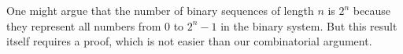 

\setcounter{section}{2}
\setcounter{subsection}{2}
\setcounter{dfn}{7}

\begin{rem}
One might argue that the number of binary sequences of length $n$ is $2^n$ because they represent all numbers from $0$ to $2^n - 1$ in the binary system.
But this result itself requires a proof, which is not easier than our combinatorial argument.
\end{rem}

